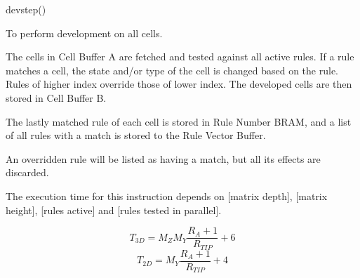 

\format

devstep()

\purpose

To perform development on all cells.

\description

The cells in Cell Buffer A are fetched and tested against all active rules.
If a rule matches a cell, the state and/or type of the cell is changed based on the rule.
Rules of higher index override those of lower index.
The developed cells are then stored in Cell Buffer B.

The lastly matched rule of each cell is stored in Rule Number BRAM, and a list of all rules with a match is stored to the Rule Vector Buffer.

\notes

An overridden rule will be listed as having a match, but all its effects are discarded.

The execution time for this instruction depends on [matrix depth], [matrix height], [rules active] and [rules tested in parallel].

$$ T_{3D} = M_Z M_Y \frac{ R_A + 1 }{ R_{TIP} } + 6 $$
$$ T_{2D} = M_Y \frac{ R_A + 1 }{ R_{TIP} } + 4 $$
